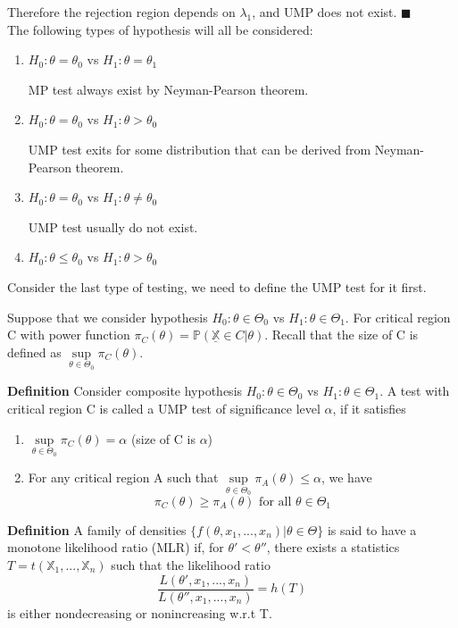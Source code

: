Therefore the rejection region depends on $\lambda_1$, and UMP does not exist. $\blacksquare$\\

The following  types of hypothesis will all be considered:
\begin{enumerate}
\item $H_0: \theta = \theta_0$ vs $H_1: \theta = \theta_1$

MP test always exist by Neyman-Pearson theorem.
\item $H_0: \theta = \theta_0$ vs $H_1: \theta > \theta_0$

UMP test exits for some distribution that can be derived from Neyman-Pearson theorem.
\item $H_0: \theta = \theta_0$ vs $H_1: \theta \neq \theta_0$

UMP test usually do not exist.
\item $H_0: \theta \leq \theta_0$ vs $H_1: \theta > \theta_0$
\end{enumerate}

Consider the last type of testing, we need to define the UMP test for it first.

Suppose that we consider hypothesis $H_0: \theta \in \Theta_0$ vs $H_1: \theta \in \Theta_1$. For critical region
 C with power function $\pi_C (\theta) = \mathbb{P}(\underline{\mathbb{X}}\in C | \theta)$. Recall that the size of C is defined as $\underset{\theta \in \Theta_0}{\sup} \pi_C (\theta)$.
 
\textbf{Definition} Consider composite hypothesis $H_0: \theta \in \Theta_0$ vs $H_1: \theta \in \Theta_1$. A test with critical region C is called a UMP test of significance level $\alpha$, if it satisfies
\begin{enumerate}
\item $\underset{\theta \in \Theta_0}{\sup} \pi_C (\theta) = \alpha$ (size of C is $\alpha$)
\item For any critical region A such that $\underset{\theta \in \Theta_0}{\sup}\pi_A(\theta) \leq \alpha$, we have
$$\pi_C(\theta) \geq \pi_A(\theta) \text{ for all } \theta \in \Theta_1$$
\end{enumerate}

\textbf{Definition} A family of densities $\{ f(\theta, x_1, ..., x_n) | \theta \in \Theta \}$ is said to have a monotone likelihood ratio (MLR) if, for $\theta' < \theta''$, there exists  a statistics $T = t(\mathbb{X}_1, ..., \mathbb{X}_n)$ such that the likelihood ratio
$$\frac{L(\theta', x_1, ..., x_n)}{L(\theta'', x_1, ..., x_n)} = h(T)$$
is either nondecreasing or nonincreasing w.r.t T.

